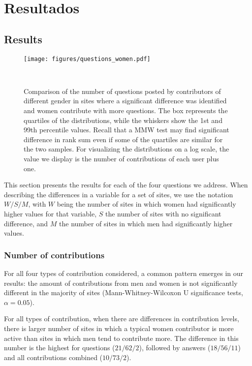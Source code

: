 \chapter{Resultados}

\section{Results} %
\label{sec:results}

\begin{figure}
  \raggedleft
  \texttt{[image: figures/questions\_women.pdf]}
  \caption{Comparison of the number of questions posted by contributors of different gender in sites where a significant difference was identified and women contribute with more questions. The box represents the quartiles of the distributions, while the whiskers show the 1st and 99th percentile values. Recall that a MMW test may find significant difference in rank sum even if some of the quartiles are similar for the two samples. For visualizing the distributions on a log scale, the value we display is the number of contributions of each user plus one. }~\label{figure:questions}
\end{figure}

This section presents the results for each of the four questions we address. When describing the differences in a variable for a set of sites, we use the notation $W/S/M$, with $W$ being the number of sites in which women had significantly higher values for that variable, $S$ the number of sites with no significant difference, and $M$ the number of sites in which men had significantly higher values.  

\subsection{Number of contributions}
For all four types of contribution considered, a common pattern emerges in our results: the amount of contributions from men and women is not significantly different in the majority of sites (Mann-Whitney-Wilcoxon U significance tests, $\alpha = 0.05$). %

For all types of contribution, when there are differences in contribution levels, there is larger number of sites in which a typical women contributor is more active than sites in which men tend to contribute more. The difference in this number is the highest for questions ($21/62/2$), followed by answers ($18/56/11$) and all contributions combined ($10/73/2$). 

